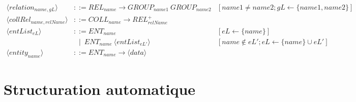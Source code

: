 \begin{frame}{}
\begin{adjustbox}{max width=\linewidth,max height=.95\textheight,valign=c}
{\begin{align*}
                \langle relation_{name, gL} \rangle         & ::= REL_{name} \to GROUP_{name1} ~ GROUP_{name2}                                                             & [name1 \neq name2; gL \gets \{name1, name2\}]                                                          \\
                \langle collRel_{name,relName} \rangle      & ::= COLL_{name} \to REL_{relName}^+                                                                                                                                                                                   \\[1em]
                \langle entList_{eL} \rangle                & ::= ENT_{name}                                                                                               & [eL \gets \{name\}]                                                                                    \\
                                                            & ~~ \mid ~ ENT_{name} ~ \langle entList_{eL'} \rangle                                                         & [name \notin eL'; eL \gets \{name\} \cup eL']                                                          \\
                \langle entity_{name} \rangle               & ::= ENT_{name} \to \langle data \rangle \label{meta:entity}
            \end{align*}}
    \end{adjustbox}
\end{frame}

\section{Structuration automatique}

